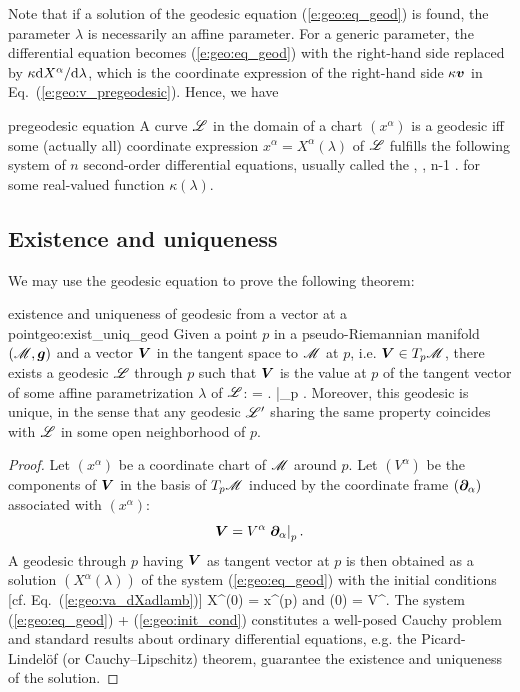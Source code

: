 Note that if a solution of the geodesic equation (\ref{e:geo:eq_geod}) is found, the parameter
$\lambda$ is necessarily an affine parameter.
For a generic parameter,
the differential equation becomes (\ref{e:geo:eq_geod}) with the right-hand side
replaced by $\kappa \mathrm{d} X^\alpha /\mathrm{d}\lambda$, which is the coordinate
expression of the right-hand side $\kappa \bm{v}$ in
Eq.~(\ref{e:geo:v_pregeodesic}). Hence, we have
\begin{tprop}{pregeodesic equation}{}
A curve $\mathscr{L}$ in the domain of a chart $(x^\alpha)$ is a geodesic
iff some (actually all) coordinate expression $x^\alpha = X^\alpha(\lambda)$
of $\mathscr{L}$ fulfills the following
system of $n$ second-order differential equations, usually called the
,
\be \label{e:geo:pregeod_eq_comp}
    ,   \leq \alpha \leq n-1 .
\ee
for some real-valued function $\kappa(\lambda)$.
\end{tprop}

\subsection{Existence and uniqueness} \label{s:geo:existence_uniqueness}

We may use the geodesic equation to prove the following
theorem:
\begin{tprop}{existence and uniqueness of geodesic from a vector at a point}{geo:exist_uniq_geod}
Given a point $p$ in a pseudo-Riemannian manifold $(\mathscr{M},\bm{g})$ and a vector
$\bm{V}$ in the tangent space to $\mathscr{M}$ at $p$, i.e. $\bm{V} \in T_p\mathscr{M}$,
there exists a geodesic $\mathscr{L}$ through $p$ such that
$\bm{V}$ is the value at $p$ of the tangent vector of some affine parametrization
$\lambda$ of $\mathscr{L}$:
\be
     = \left.  \right|_p .
\ee
Moreover, this geodesic is unique, in the sense that any geodesic $\mathscr{L}'$
sharing the same property coincides with $\mathscr{L}$
in some open neighborhood of $p$.
\end{tprop}

\begin{proof}
Let $(x^\alpha)$ be a coordinate chart of $\mathscr{M}$ around $p$. Let $(V^\alpha)$
be the components of $\bm{V}$ in the basis of $T_p\mathscr{M}$ induced by
the coordinate frame $(\bm{\partial}_\alpha)$ associated with $(x^\alpha)$:
\[
    \bm{V} = V^\alpha \left. \bm{\partial}_\alpha \right| _p .
\]
A geodesic through $p$ having $\bm{V}$ as tangent vector at $p$ is then
obtained as a solution $(X^\alpha(\lambda))$ of the system (\ref{e:geo:eq_geod})
with the initial conditions [cf. Eq.~(\ref{e:geo:va_dXadlamb})]
\be \label{e:geo:init_cond}
    X^\alpha(0) = x^\alpha(p) \quad\mbox{and}\quad
    (0) = V^\alpha .
\ee
The system (\ref{e:geo:eq_geod}) + (\ref{e:geo:init_cond}) constitutes a well-posed
Cauchy problem and standard results about ordinary
differential equations, e.g. the Picard-Lindelöf (or Cauchy–Lipschitz) theorem,
guarantee the existence and uniqueness of the solution.
\end{proof}

